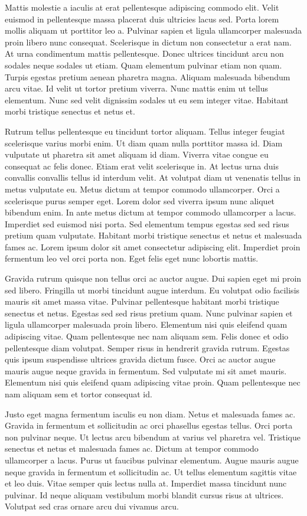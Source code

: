 \documentclass[11pt,a4paper]{article}
\begin{document}
Mattis molestie a iaculis at erat pellentesque adipiscing commodo elit. Velit euismod in pellentesque massa placerat duis ultricies lacus sed. Porta lorem mollis aliquam ut porttitor leo a. Pulvinar sapien et ligula ullamcorper malesuada proin libero nunc consequat. Scelerisque in dictum non consectetur a erat nam. At urna condimentum mattis pellentesque. Donec ultrices tincidunt arcu non sodales neque sodales ut etiam. Quam elementum pulvinar etiam non quam. Turpis egestas pretium aenean pharetra magna. Aliquam malesuada bibendum arcu vitae. Id velit ut tortor pretium viverra. Nunc mattis enim ut tellus elementum. Nunc sed velit dignissim sodales ut eu sem integer vitae. Habitant morbi tristique senectus et netus et.

Rutrum tellus pellentesque eu tincidunt tortor aliquam. Tellus integer feugiat scelerisque varius morbi enim. Ut diam quam nulla porttitor massa id. Diam vulputate ut pharetra sit amet aliquam id diam. Viverra vitae congue eu consequat ac felis donec. Etiam erat velit scelerisque in. At lectus urna duis convallis convallis tellus id interdum velit. At volutpat diam ut venenatis tellus in metus vulputate eu. Metus dictum at tempor commodo ullamcorper. Orci a scelerisque purus semper eget. Lorem dolor sed viverra ipsum nunc aliquet bibendum enim. In ante metus dictum at tempor commodo ullamcorper a lacus. Imperdiet sed euismod nisi porta. Sed elementum tempus egestas sed sed risus pretium quam vulputate. Habitant morbi tristique senectus et netus et malesuada fames ac. Lorem ipsum dolor sit amet consectetur adipiscing elit. Imperdiet proin fermentum leo vel orci porta non. Eget felis eget nunc lobortis mattis.

Gravida rutrum quisque non tellus orci ac auctor augue. Dui sapien eget mi proin sed libero. Fringilla ut morbi tincidunt augue interdum. Eu volutpat odio facilisis mauris sit amet massa vitae. Pulvinar pellentesque habitant morbi tristique senectus et netus. Egestas sed sed risus pretium quam. Nunc pulvinar sapien et ligula ullamcorper malesuada proin libero. Elementum nisi quis eleifend quam adipiscing vitae. Quam pellentesque nec nam aliquam sem. Felis donec et odio pellentesque diam volutpat. Semper risus in hendrerit gravida rutrum. Egestas quis ipsum suspendisse ultrices gravida dictum fusce. Orci ac auctor augue mauris augue neque gravida in fermentum. Sed vulputate mi sit amet mauris. Elementum nisi quis eleifend quam adipiscing vitae proin. Quam pellentesque nec nam aliquam sem et tortor consequat id.

Justo eget magna fermentum iaculis eu non diam. Netus et malesuada fames ac. Gravida in fermentum et sollicitudin ac orci phasellus egestas tellus. Orci porta non pulvinar neque. Ut lectus arcu bibendum at varius vel pharetra vel. Tristique senectus et netus et malesuada fames ac. Dictum at tempor commodo ullamcorper a lacus. Purus ut faucibus pulvinar elementum. Augue mauris augue neque gravida in fermentum et sollicitudin ac. Ut tellus elementum sagittis vitae et leo duis. Vitae semper quis lectus nulla at. Imperdiet massa tincidunt nunc pulvinar. Id neque aliquam vestibulum morbi blandit cursus risus at ultrices. Volutpat sed cras ornare arcu dui vivamus arcu.
\end{document}
